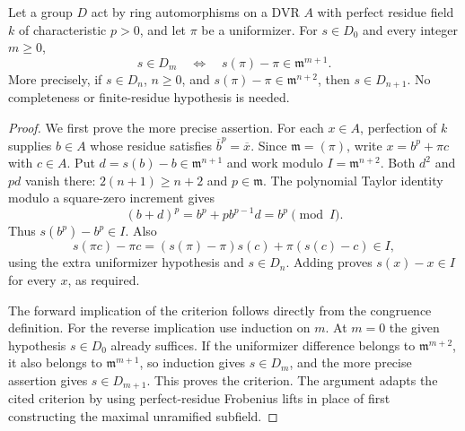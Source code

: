 \begin{lemma}
\label{fw:perfect-residue-uniformizer-criterion}
\leanok
Let a group $D$ act by ring automorphisms on a DVR $A$ with
perfect residue field $k$ of characteristic $p>0$, and let $\pi$
be a uniformizer. For $s\in D_0$ and every integer $m\geq0$,
\[
 s\in D_m\quad\Longleftrightarrow\quad
 s(\pi)-\pi\in\mathfrak m^{m+1}.
\]
More precisely, if $s\in D_n$, $n\geq0$, and
$s(\pi)-\pi\in\mathfrak m^{n+2}$, then $s\in D_{n+1}$.
No completeness or finite-residue hypothesis is needed.
\end{lemma}
\begin{proof}
We first prove the more precise assertion. For each $x\in A$,
perfection of $k$ supplies $b\in A$ whose residue satisfies
$\overline b^p=\overline x$. Since $\mathfrak m=(\pi)$,
write $x=b^p+\pi c$ with $c\in A$.
Put $d=s(b)-b\in\mathfrak m^{n+1}$ and work modulo
$I=\mathfrak m^{n+2}$. Both $d^2$ and $pd$ vanish there:
$2(n+1)\geq n+2$ and $p\in\mathfrak m$.
The polynomial Taylor identity modulo a square-zero increment gives
\[
 (b+d)^p=b^p+pb^{p-1}d=b^p\pmod I.
\]
Thus $s(b^p)-b^p\in I$. Also
\[
 s(\pi c)-\pi c=(s(\pi)-\pi)s(c)+\pi(s(c)-c)\in I,
\]
using the extra uniformizer hypothesis and $s\in D_n$.
Adding proves $s(x)-x\in I$ for every $x$, as required.

The forward implication of the criterion follows directly from the
congruence definition. For the reverse implication use induction on
$m$. At $m=0$ the given hypothesis $s\in D_0$ already suffices.
If the uniformizer difference belongs to $\mathfrak m^{m+2}$,
it also belongs to $\mathfrak m^{m+1}$, so induction gives
$s\in D_m$, and the more precise assertion gives $s\in D_{m+1}$.
This proves the criterion. The argument adapts the cited criterion
by using perfect-residue Frobenius lifts in place of first constructing
the maximal unramified subfield.
\end{proof}

